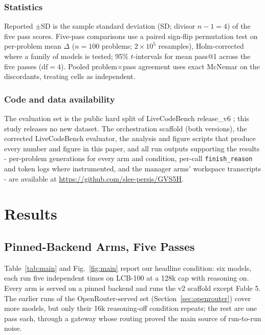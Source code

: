 \documentclass[journal]{IEEEtran}
\begin{document}
\subsubsection{Statistics} Reported $\pm$SD is the sample standard deviation (SD; divisor $n-1 = 4$) of the five
pass scores. Five-pass comparisons use a paired sign-flip permutation test on per-problem
mean $\Delta$ ($n = 100$ problems; $2\times10^{5}$ resamples), Holm-corrected where a family
of models is tested; 95\% $t$-intervals for mean pass@1 across the five passes
($\mathrm{df} = 4$). Pooled problem$\times$pass agreement uses exact McNemar on the
discordants, treating cells as independent.

\subsubsection{Code and data availability} The evaluation set is the public hard split of
LiveCodeBench release\_v6 \cite{jain2024}; this study releases no new dataset. The orchestration
scaffold (both versions), the corrected LiveCodeBench evaluator, the analysis and figure scripts
that produce every number and figure in this paper, and all run outputs supporting the
results - per-problem generations for every arm and condition, per-call \texttt{finish\_reason}
and token logs where instrumented, and the manager arms' workspace transcripts - are available
at \url{https://github.com/slee-persis/GVS5H}.

\section{Results}
\label{sec:results}

\subsection{Pinned-Backend Arms, Five Passes}
\label{sec:pinned}





Table~\ref{tab:main} and Fig.~\ref{fig:main} report our headline condition: six models, each run five independent times on LCB-100 at a 128k
cap with reasoning on. Every arm is served on a pinned backend and runs the v2 scaffold except Fable 5. The
earlier runs of the OpenRouter-served set (Section~\ref{sec:openrouter}) cover more models,
but only their 16k reasoning-off condition repeats; the rest are one pass each, through a
gateway whose routing proved the main source of run-to-run noise.
\end{document}
